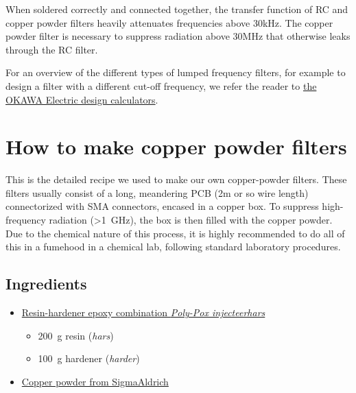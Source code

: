 When soldered correctly and connected together, the transfer function of RC and copper powder filters heavily attenuates frequencies above 30kHz. The copper powder filter is necessary to suppress radiation above 30MHz that otherwise leaks through the RC filter.

For an overview of the different types of lumped frequency filters, for example to design a filter with a different cut-off frequency, we refer the reader to \href{http://sim.okawa-denshi.jp/en/Fkeisan.htm}{the OKAWA Electric design calculators}.

\section{How to make copper powder filters}\label{app:copperpowder}
This is the detailed recipe we used to make our own copper-powder filters.
These filters usually consist of a long, meandering PCB (2m or so wire length) connectorized with SMA connectors, encased in a copper box. To suppress high-frequency radiation (>\SI{1}{\giga\hertz}), the box is then filled with the copper powder. Due to the chemical nature of this process, it is highly recommended to do all of this in a fumehood in a chemical lab, following standard laboratory procedures.

\subsection{Ingredients}
\begin{itemize}
	\item \href{https://www.polyservice.nl/epoxyhars-sets/374-poly-pox-injecteerhars.html?search_query=injecteer&results=8}{Resin-hardener epoxy combination \textit{Poly-Pox injecteerhars}}
	\begin{itemize}
		\item \SI{200}{\gram} resin (\textit{hars})
		\item \SI{100}{\gram} hardener (\textit{harder})
	\end{itemize}
	\item \href{https://www.sigmaaldrich.com/catalog/product/aldrich/326453?lang=en&region=NL}{Copper powder from SigmaAldrich}
\end{itemize}

